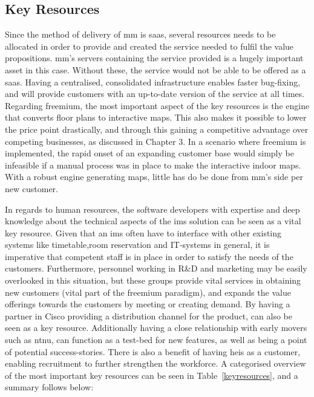 \subsection{Key Resources}
Since the method of delivery of \gls{mm} is \gls{saas}, several resources needs to be allocated in order to provide and created the service needed to fulfil the value propositions. \gls{mm}'s servers containing the service provided is a hugely important asset in this case. Without these, the service would not be able to be offered as a \gls{saas}. Having a centralised, consolidated infrastructure enables faster bug-fixing, and will provide customers with an up-to-date version of the service at all times. Regarding freemium, the most important aspect of the key resources is the engine that converts floor plans to interactive maps. This also makes it possible to lower the price point drastically, and through this gaining a competitive advantage over competing businesses, as discussed in Chapter 3. In a scenario where freemium is implemented, the rapid onset of an expanding customer base would simply be infeasible if a manual process was in place to make the interactive indoor maps. With a robust engine generating maps, little has do be done from \gls{mm}'s side per new customer.


In regards to human resources, the software developers with expertise and deep knowledge about the technical aspects of the \gls{ims} solution can be seen as a vital key resource. Given that an \gls{ims} often have to interface with other existing systems like timetable,room reservation and IT-systems in general, it is imperative that competent staff is in place in order to satisfy the needs of the customers. Furthermore, personnel working in R\&D and marketing may be easily overlooked in this situation, but these groups provide vital services in obtaining new customers (vital part of the freemium paradigm), and expands the value offerings towards the customers by meeting or creating demand. By having a partner in Cisco providing a distribution channel for the product, can also be seen as a key resource. Additionally having a close relationship with early movers such as \gls{ntnu}, can function as a test-bed for new features, as well as being a point of potential success-stories. There is also a benefit of having \glspl{hei} as a customer, enabling recruitment to further strengthen the workforce. A categorised overview of the most important key resources can be seen in Table~\ref{keyresources}, and a summary follows below:

